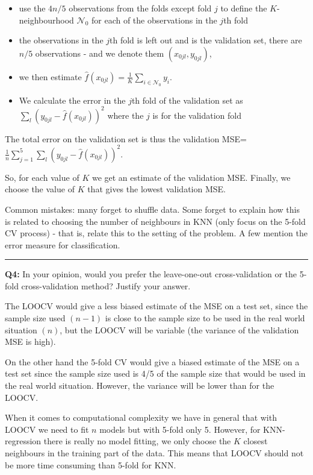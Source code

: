\documentclass[]{article}
\providecommand{\tightlist}{%
  \setlength{\itemsep}{0pt}\setlength{\parskip}{0pt}}
\begin{document}
\begin{itemize}
\tightlist
\item
  use the \(4n/5\) observations from the folds except fold \(j\) to
  define the \(K\)-neighbourhood \(\mathcal{N}_0\) for each of the
  observations in the \(j\)th fold
\item
  the observations in the \(j\)th fold is left out and is the validation
  set, there are \(n/5\) observations - and we denote them
  \((x_{0jl},y_{0jl})\),
\item
  we then estimate
  \(\hat{f}(x_{0jl})=\frac{1}{K}\sum_{i\in \mathcal{N}_0} y_i\).
\item
  We calculate the error in the \(j\)th fold of the validation set as
  \(\sum_{l} (y_{0jl}-\hat{f}(x_{0jl}))^2\) where the \(j\) is for the
  validation fold
\end{itemize}

The total error on the validation set is thus the validation
MSE=\(\frac{1}{n}\sum_{j=1}^5 \sum_{l}(y_{0jl}-\hat{f}(x_{0jl}))^2\).

So, for each value of \(K\) we get an estimate of the validation MSE.
Finally, we choose the value of \(K\) that gives the lowest validation
MSE.

Common mistakes: many forget to shuffle data. Some forget to explain how
this is related to choosing the number of neighbours in KNN (only focus
on the 5-fold CV process) - that is, relate this to the setting of the
problem. A few mention the error measure for classification.

\begin{center}\rule{0.5\linewidth}{\linethickness}\end{center}

\textbf{Q4:} In your opinion, would you prefer the leave-one-out
cross-validation or the 5-fold cross-validation method? Justify your
answer.

The LOOCV would give a less biased estimate of the MSE on a test set,
since the sample size used \((n-1)\) is close to the sample size to be
used in the real world situation \((n)\), but the LOOCV will be variable
(the variance of the validation MSE is high).

On the other hand the 5-fold CV would give a biased estimate of the MSE
on a test set since the sample size used is 4/5 of the sample size that
would be used in the real world situation. However, the variance will be
lower than for the LOOCV.

When it comes to computational complexity we have in general that with
LOOCV we need to fit \(n\) models but with 5-fold only 5. However, for
KNN-regression there is really no model fitting, we only choose the
\(K\) closest neighbours in the training part of the data. This means
that LOOCV should not be more time consuming than 5-fold for KNN.
\end{document}
